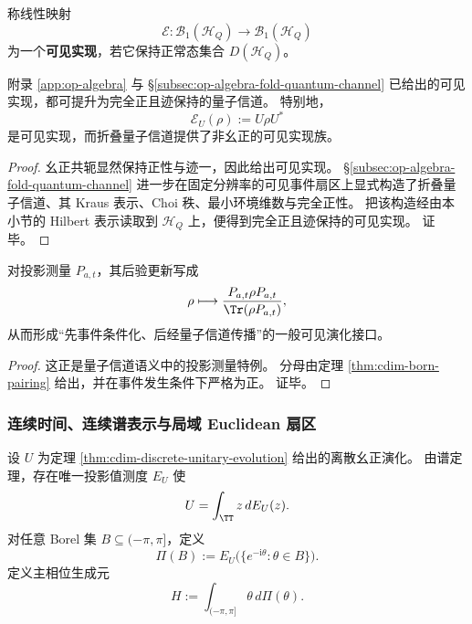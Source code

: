 \begin{definition}[可见实现]\label{def:cdim-visible-realization}
称线性映射
\[
\mathcal E:\mathcal B_1(\mathcal H_Q)\to\mathcal B_1(\mathcal H_Q)
\]
为一个\textbf{可见实现}，若它保持正常态集合 \(D(\mathcal H_Q)\)。
\end{definition}

\begin{theorem}[量子信道]\label{thm:cdim-quantum-channels}
附录 \ref{app:op-algebra} 与 \S\ref{subsec:op-algebra-fold-quantum-channel} 已给出的可见实现，都可提升为完全正且迹保持的量子信道。
特别地，
\[
\mathcal E_U(\rho):=U\rho U^\ast
\]
是可见实现，而折叠量子信道提供了非幺正的可见实现族。
\end{theorem}
\begin{proof}
幺正共轭显然保持正性与迹一，因此给出可见实现。
\S\ref{subsec:op-algebra-fold-quantum-channel} 进一步在固定分辨率的可见事件扇区上显式构造了折叠量子信道、其 Kraus 表示、Choi 秩、最小环境维数与完全正性。
把该构造经由本小节的 Hilbert 表示读取到 \(\mathcal H_Q\) 上，便得到完全正且迹保持的可见实现。
证毕。
\end{proof}

\begin{corollary}[条件化更新]\label{cor:cdim-luders-update}
对投影测量 \(P_{a,t}\)，其后验更新写成
\[
\rho\longmapsto
\frac{P_{a,t}\rho P_{a,t}}{\Tr(\rho P_{a,t})},
\]
从而形成“先事件条件化、后经量子信道传播”的一般可见演化接口。
\end{corollary}
\begin{proof}
这正是量子信道语义中的投影测量特例。
分母由定理 \ref{thm:cdim-born-pairing} 给出，并在事件发生条件下严格为正。
证毕。
\end{proof}

\subsubsection{连续时间、连续谱表示与局域 Euclidean 扇区}
\begin{definition}[主相位生成元]\label{def:cdim-principal-phase-generator}
设 \(U\) 为定理 \ref{thm:cdim-discrete-unitary-evolution} 给出的离散幺正演化。
由谱定理，存在唯一投影值测度 \(E_U\) 使
\[
U=\int_{\TT} z\,dE_U(z).
\]
对任意 Borel 集 \(B\subseteq(-\pi,\pi]\)，定义
\[
\Pi(B):=E_U\bigl(\{e^{-\mathrm i\theta}:\theta\in B\}\bigr).
\]
定义主相位生成元
\[
H:=\int_{(-\pi,\pi]}\theta\,d\Pi(\theta).
\]
\end{definition}

